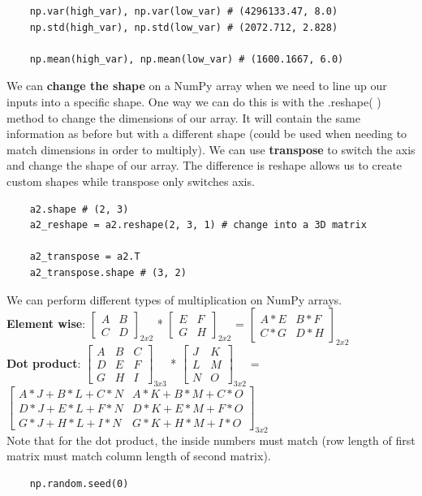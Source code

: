 \documentclass[11pt, a4paper]{article}
\begin{document}
\begin{spacing}{1.1}
\begin{lstlisting}
	np.var(high_var), np.var(low_var) # (4296133.47, 8.0)
	np.std(high_var), np.std(low_var) # (2072.712, 2.828)
	
	np.mean(high_var), np.mean(low_var) # (1600.1667, 6.0) \end{lstlisting} \vspace*{1mm} 
	We can \textbf{change the shape} on a NumPy array when we need to line up our inputs into a specific shape. One way we can do this is with the .reshape( ) method to change the dimensions of our array. It will contain the same information as before but with a different shape (could be used when needing to match dimensions in order to multiply). We can use \textbf{transpose} to switch the axis and change the shape of our array. The difference is reshape allows us to create custom shapes while transpose only switches axis. 
	\begin{lstlisting}
	a2.shape # (2, 3)
	a2_reshape = a2.reshape(2, 3, 1) # change into a 3D matrix 
	
	a2_transpose = a2.T 
	a2_transpose.shape # (3, 2) \end{lstlisting} \vspace*{1mm} 
	We can perform different types of multiplication on NumPy arrays. \vspace*{2mm}\\ \textbf{Element wise}: $\begin{bmatrix} A & B \\ C & D \end{bmatrix}_{2x2}$ * $\begin{bmatrix} E & F \\ G & H \end{bmatrix}_{2x2}$ = $\begin{bmatrix} A*E & B*F \\ C*G & D*H \end{bmatrix}_{2x2}$ \vspace*{2mm} \\
	\textbf{Dot product}: $\begin{bmatrix} A & B & C \\ D & E & F \\ G & H & I \end{bmatrix}_{3x3}$ * $\begin{bmatrix} J & K \\ L & M \\ N & O \end{bmatrix}_{3x2}$ = $\begin{bmatrix} A*J + B*L + C*N & A*K + B*M + C*O \\ D*J + E*L + F*N & D*K + E*M + F*O \\ G*J + H*L + I*N & G*K + H*M + I*O \end{bmatrix}_{3x2}$ \vspace*{1mm} \\
	Note that for the dot product, the inside numbers must match (row length of first matrix must match column length of second matrix). 
	\begin{lstlisting}
	np.random.seed(0)
	

\end{lstlisting}
\end{spacing}
\end{document}
